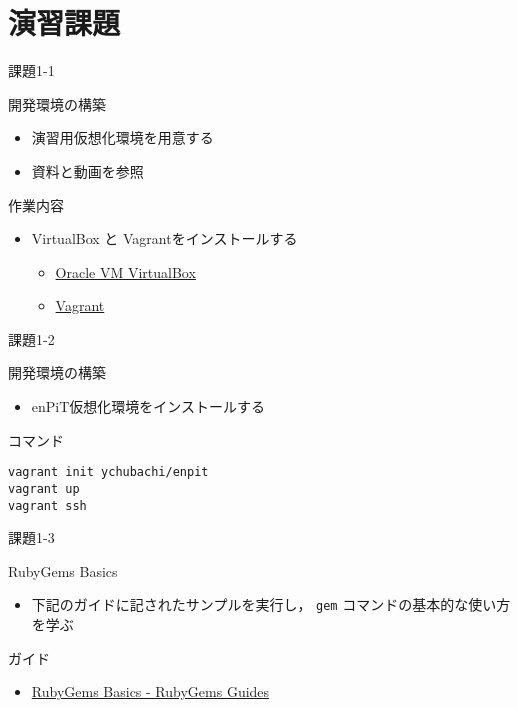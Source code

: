 \documentclass[t, aspectratio=169]{beamer}
\begin{document}
\section{演習課題}
\label{sec-1-5}
\begin{frame}[label=sec-1-5-1]{課題1-1}
\begin{block}{開発環境の構築}
\begin{itemize}
\item 演習用仮想化環境を用意する
\item 資料と動画を参照
\end{itemize}
\end{block}

\begin{block}{作業内容}
\begin{itemize}
\item VirtualBox と Vagrantをインストールする
\begin{itemize}
\item \href{https://www.virtualbox.org/}{Oracle VM VirtualBox}
\item \href{https://www.vagrantup.com/}{Vagrant}
\end{itemize}
\end{itemize}
\end{block}
\end{frame}

\begin{frame}[fragile,label=sec-1-5-2]{課題1-2}
 \begin{block}{開発環境の構築}
\begin{itemize}
\item enPiT仮想化環境をインストールする
\end{itemize}
\end{block}

\begin{block}{コマンド}
\begin{verbatim}
vagrant init ychubachi/enpit
vagrant up
vagrant ssh
\end{verbatim}
\end{block}
\end{frame}
\begin{frame}[fragile,label=sec-1-5-3]{課題1-3}
 \begin{block}{RubyGems Basics}
\begin{itemize}
\item 下記のガイドに記されたサンプルを実行し，
\texttt{gem} コマンドの基本的な使い方を学ぶ
\end{itemize}
\end{block}

\begin{block}{ガイド}
\begin{itemize}
\item \href{http://guides.rubygems.org/rubygems-basics/}{RubyGems Basics - RubyGems Guides}
\end{itemize}
\end{block}
\end{frame}
\end{document}
